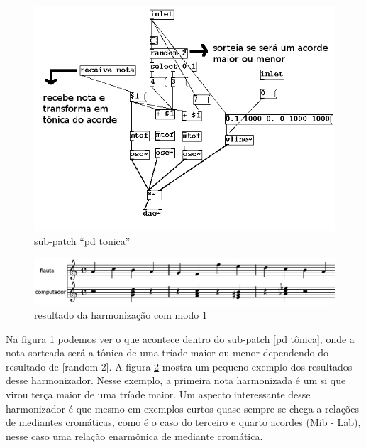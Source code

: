 \documentclass[draft]{ppgmus}
\begin{document}
\begin{figure}
\includegraphics[scale=.6]{harm2}
\caption{sub-patch ``pd tonica''}
\label{harm2}
\end{figure}

\begin{figure}
\includegraphics[scale=.4]{harm3}
\caption{resultado da harmonização com modo 1}
\label{harm3}
\end{figure}


Na figura \ref{harm2} podemos ver o que acontece dentro do sub-patch [pd tônica], onde a nota sorteada 
será a tônica de uma tríade maior ou menor dependendo do resultado de [random 2]. A figura \ref{harm3} 
mostra um pequeno exemplo dos resultados desse harmonizador. Nesse exemplo, a primeira nota 
harmonizada é um si que virou terça maior de uma tríade maior. Um aspecto interessante desse 
harmonizador é que mesmo em exemplos curtos quase sempre se chega a relações de mediantes 
cromáticas, como é o caso do terceiro e quarto acordes (Mib - Lab), nesse caso uma relação 
enarmônica de mediante cromática.
\end{document}
